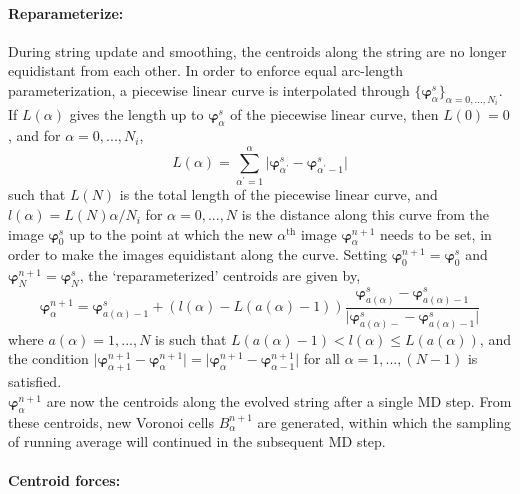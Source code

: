 \documentclass{article}
\begin{document}
\paragraph*{Reparameterize:}

During string update and smoothing, the centroids along the string are no longer equidistant from each other. In order to enforce equal arc-length parameterization, a piecewise linear curve is interpolated through $\{\bm{\varphi}_{\alpha}^s\}_{\alpha=0,...,N_i}$. If $L(\alpha)$ gives the length up to $\bm{\varphi}_{\alpha}^s$ of the piecewise linear curve, then $L(0) = 0$, and for $\alpha=0,...,N_i$,
%
\begin{equation} \label{eq:28}
L(\alpha) = \sum_{\alpha^{\prime} = 1}^{\alpha} \mathopen|\bm{\varphi}_{\alpha^{\prime}}^{s} - \bm{\varphi}_{\alpha^{\prime}-1}^{s}\mathclose|
\end{equation}
such that $L(N)$ is the total length of the piecewise linear curve, and $l(\alpha) = L(N){\alpha}/N_i$ for $\alpha=0,...,N$ is the distance along this curve from the image $\bm{\varphi}_0^s$ up to the point at which the new $\alpha^{\text{th}}$ image $\bm{\varphi}_{\alpha}^{n+1}$ needs to be set, in order to make the images equidistant along the curve. Setting $\bm{\varphi}_{0}^{n+1} = \bm{\varphi}_{0}^s$ and $\bm{\varphi}_{N}^{n+1} = \bm{\varphi}_{N}^s$, the \enquote*{reparameterized} centroids are given by,
%
\begin{equation} \label{eq:29}
\bm{\varphi}_{\alpha}^{n+1} = \bm{\varphi}_{a(\alpha)-1}^s + (l(\alpha) - L(a(\alpha) -1)) \dfrac{\bm{\varphi}_{a(\alpha)}^s - \bm{\varphi}_{a(\alpha)-1}^s}{\mathopen|\bm{\varphi}_{a(\alpha)-}^s - \bm{\varphi}_{a(\alpha)-1}^s\mathclose|}
\end{equation}
% 
where $a(\alpha)=1,...,N$ is such that $L(a(\alpha) - 1) < l(\alpha) \leq L(a(\alpha))$, and the condition $\mathopen|\bm{\varphi}_{\alpha + 1}^{n+1} - \bm{\varphi}_{\alpha}^{n+1}\mathclose| = \mathopen|\bm{\varphi}_{\alpha}^{n+1} - \bm{\varphi}_{\alpha - 1}^{n+1}\mathclose|$ for all $\alpha=1,...,(N -1)$ is satisfied. \\

\noindent $\bm{\varphi}_{\alpha}^{n+1}$ are now the centroids along the evolved string after a single MD step. From these centroids, new Voronoi cells $B_{\alpha}^{n+1}$ are generated, within which the sampling of running average will continued in the subsequent MD step.

\paragraph*{Centroid forces:}
\end{document}
